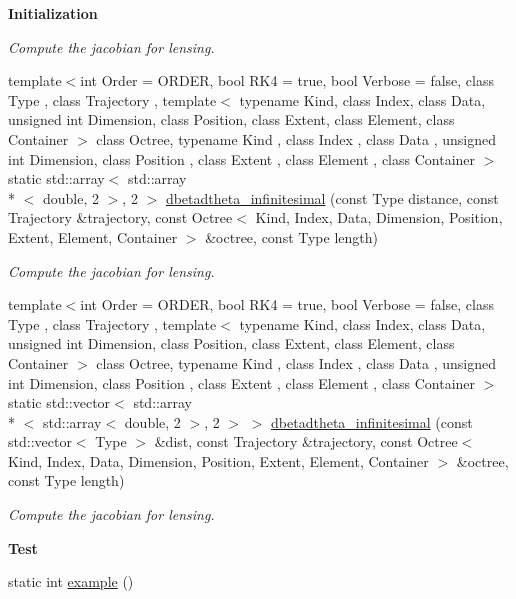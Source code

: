 \begin{Indent}{\bf Initialization}
\begin{DoxyCompactItemize}
\begin{DoxyCompactList}\small\item\em Compute the jacobian for lensing. \end{DoxyCompactList}\item 
{\footnotesize template$<$int Order = O\-R\-D\-E\-R, bool R\-K4 = true, bool Verbose = false, class Type , class Trajectory , template$<$ typename Kind, class Index, class Data, unsigned int Dimension, class Position, class Extent, class Element, class Container $>$ class Octree, typename Kind , class Index , class Data , unsigned int Dimension, class Position , class Extent , class Element , class Container $>$ }\\static std\-::array$<$ std\-::array\\*
$<$ double, 2 $>$, 2 $>$ \hyperlink{classLensing_a431cf5032e118d142877116cbe312a9f}{dbetadtheta\-\_\-infinitesimal} (const Type distance, const Trajectory \&trajectory, const Octree$<$ Kind, Index, Data, Dimension, Position, Extent, Element, Container $>$ \&octree, const Type length)
\begin{DoxyCompactList}\small\item\em Compute the jacobian for lensing. \end{DoxyCompactList}\item 
{\footnotesize template$<$int Order = O\-R\-D\-E\-R, bool R\-K4 = true, bool Verbose = false, class Type , class Trajectory , template$<$ typename Kind, class Index, class Data, unsigned int Dimension, class Position, class Extent, class Element, class Container $>$ class Octree, typename Kind , class Index , class Data , unsigned int Dimension, class Position , class Extent , class Element , class Container $>$ }\\static std\-::vector$<$ std\-::array\\*
$<$ std\-::array$<$ double, 2 $>$, 2 $>$ $>$ \hyperlink{classLensing_ac502c98ab1cbd79e435c1fb2d1febb31}{dbetadtheta\-\_\-infinitesimal} (const std\-::vector$<$ Type $>$ \&dist, const Trajectory \&trajectory, const Octree$<$ Kind, Index, Data, Dimension, Position, Extent, Element, Container $>$ \&octree, const Type length)
\begin{DoxyCompactList}\small\item\em Compute the jacobian for lensing. \end{DoxyCompactList}\end{DoxyCompactItemize}
\end{Indent}
\begin{Indent}{\bf Test}\par
\begin{DoxyCompactItemize}
\item 
static int \hyperlink{classLensing_a34fb0894ad4b5e2ffce28016455c9c75}{example} ()
\end{DoxyCompactItemize}
\end{Indent}


